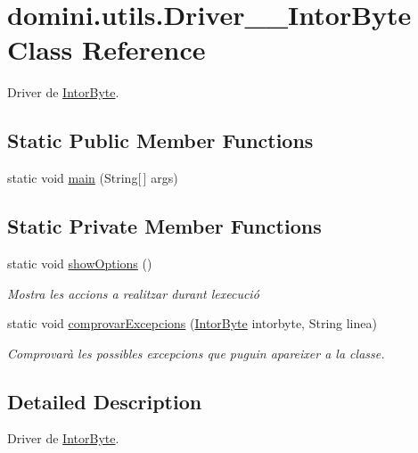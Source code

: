 \hypertarget{classdomini_1_1utils_1_1Driver____IntorByte}{}\section{domini.\+utils.\+Driver\+\_\+\+\_\+\+Intor\+Byte Class Reference}
\label{classdomini_1_1utils_1_1Driver____IntorByte}


Driver de \hyperlink{classdomini_1_1utils_1_1IntorByte}{Intor\+Byte}.  


\subsection*{Static Public Member Functions}
\begin{DoxyCompactItemize}
\item 
static void \hyperlink{classdomini_1_1utils_1_1Driver____IntorByte_a82ac3bdc9baf9f3fa1b8984733d03240}{main} (String\mbox{[}$\,$\mbox{]} args)
\end{DoxyCompactItemize}
\subsection*{Static Private Member Functions}
\begin{DoxyCompactItemize}
\item 
static void \hyperlink{classdomini_1_1utils_1_1Driver____IntorByte_a4b647dae1760fc058de9a7311595d8dd}{show\+Options} ()
\begin{DoxyCompactList}\small\item\em Mostra les accions a realitzar durant l\textquotesingle{}execució \end{DoxyCompactList}\item 
static void \hyperlink{classdomini_1_1utils_1_1Driver____IntorByte_a3cb28e1e1b318e0b8e4809ebd171c8b2}{comprovar\+Excepcions} (\hyperlink{classdomini_1_1utils_1_1IntorByte}{Intor\+Byte} intorbyte, String linea)
\begin{DoxyCompactList}\small\item\em Comprovarà les possibles excepcions que puguin apareixer a la classe. \end{DoxyCompactList}\end{DoxyCompactItemize}


\subsection{Detailed Description}
Driver de \hyperlink{classdomini_1_1utils_1_1IntorByte}{Intor\+Byte}. 

